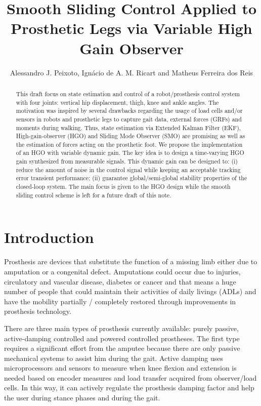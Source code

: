 \documentclass[letterpaper, 10 pt, journal, twocolumn]{IEEEtran}  %
\title{\LARGE \bf
Smooth Sliding Control Applied to Prosthetic Legs via Variable High Gain Observer}
\author{Alessandro J. Peixoto, %
        Ign\'{a}cio de A. M. Ricart and
        Matheus Ferreira dos Reis %
}
\theoremstyle{plain}
\theoremstyle{definition}
\theoremstyle{remark}
\begin{document}

\maketitle
\thispagestyle{empty}
\pagestyle{empty}
\begin{abstract}%
This draft focus on state estimation and control of a robot/prosthesis control system with four joints: vertical hip displacement, thigh, knee and ankle angles. The motivation was inspired by several drawbacks regarding the usage of load cells and/or sensors in robots and prosthetic legs to capture gait data, external forces (GRFs) and moments during walking. Thus, state estimation via Extended Kalman Filter (EKF), High-gain-observer (HGO) and Sliding Mode Observer (SMO) are promising as well as the estimation of forces acting on the prosthetic foot. We propose the implementation of an HGO with variable dynamic gain. The key idea is to design a time-varying HGO gain synthesized from measurable signals. This dynamic gain can be designed to: (i) reduce the amount of noise in the control signal while keeping an acceptable tracking error  transient performance; (ii) guarantee global/semi-global stability properties of the closed-loop system. The main focus is given to the HGO design while the smooth sliding control scheme is left for a future draft of this note. 
\end{abstract}
\section{Introduction}

Prosthesis are devices that substitute the function of a missing limb either due to amputation or a congenital defect. Amputations could occur due to injuries, circulatory and vascular disease, diabetes or cancer and that means a huge number of people that could maintain their activities of daily livings (ADLs) and have the mobility partially / completely restored through improvements in prosthesis technology. 

There are three main types of prosthesis currently available: purely passive, active-damping controlled and powered controlled prostheses. The first type requires a significant effort from the amputee because there are only passive mechanical systems to assist him during the gait. Active damping uses microprocessors and sensors to measure when knee flexion and extension is needed based on encoder measures and load transfer acquired from observer/load cells. In this way, it can actively regulate the prosthesis damping factor and help the user during stance phases and during the gait.
\end{document}
